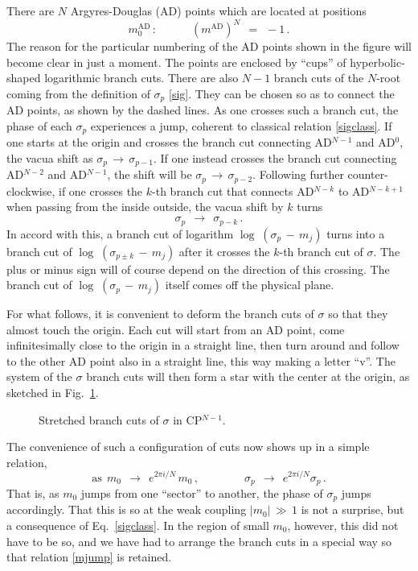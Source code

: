 \documentclass[epsfig,12pt]{article}
\def\beq{\begin{equation}}
\def\eeq{\end{equation}}
\def\beq{\begin{equation}}
\def\eeq{\end{equation}}
\begin{document}
	There are $ N $ Argyres-Douglas (AD) points \cite{AD} which are located at positions
\beq
	m_0^\text{AD} \,: \qquad\quad \left( m^\text{AD} \right)^N ~~=~~ -1 \,.
\eeq
	The reason for the particular numbering of the AD points shown in the figure will become clear in just a moment.
	The points are enclosed by ``cups'' of hyperbolic-shaped logarithmic branch cuts.
	There are also $ N - 1 $ branch cuts of the $ N $-root coming from the definition of $ \sigma_p $ \eqref{sig}.
	They can be chosen so as to connect the AD points, as shown by the dashed lines.
	As one crosses such a branch cut, the phase of each $ \sigma_p $ experiences a jump, 
	coherent to classical relation \eqref{sigclass}. 
	If one starts at the origin and crosses the branch cut connecting AD$^{N-1}$ and AD$^0$, 
	the vacua shift as $ \sigma_p \,\to\, \sigma_{p-1} $.
	If one instead crosses the branch cut connecting AD$^{N-2}$ and AD$^{N-1}$,
	the shift will be $ \sigma_p \,\to\, \sigma_{p-2} $.
	Following further counter-clockwise, if one crosses the $ k $-th branch cut 
	that connects AD$^{N-k}$ to AD$^{N-k+1}$ when passing from the inside outside, the vacua shift by $ k $ turns
\beq
\label{sigshift}
	\sigma_p ~~\to~~ \sigma_{p-k} \,.
\eeq
	In accord with this, a branch cut of logarithm $ \log\;( \sigma_p \,-\, m_j ) $ turns into 
	a branch cut of $ \log\;( \sigma_{p \pm k} \,-\, m_j ) $ after it crosses the $ k $-th branch cut of $ \sigma $. 
	The plus or minus sign will of course depend on the direction of this crossing. 
	The branch cut of $ \log\;( \sigma_p \,-\, m_j ) $ itself comes off the physical plane.

	For what follows, it is convenient to deform the branch cuts of $ \sigma $ so that they almost touch the origin.
	Each cut will start from an AD point, come infinitesimally close to the origin in a straight line, 
	then turn around and follow to the other AD point also in a straight line, this way making a letter ``v''.
	The system of the $ \sigma $ branch cuts will then form a star with the center at the origin, as sketched in Fig.~\ref{fsigcpn}.
\begin{figure}
\begin{center}
\epsfxsize=8.0cm
\caption{Stretched branch cuts of $ \sigma $ in CP$^{N-1}$.}
\label{fsigcpn}
\end{center}
\end{figure}
	The convenience of such a configuration of cuts now shows up in a simple relation,
\beq
\label{mjump}
	\text{as}~~ m_0 ~~\to~~ e^{2\pi i / N}\, m_0\,,  \qquad\qquad \sigma_p ~~\to~~ e^{2\pi i / N} \sigma_p\,.
\eeq
	That is, as $ m_0 $ jumps from one ``sector'' to another, the phase of $ \sigma_p $ jumps accordingly.
	That this is so at the weak coupling $ |m_0| \,\gg\, 1 $ is not a surprise, but a consequence of Eq.~\eqref{sigclass}.
	In the region of small $ m_0 $, however, this did not have to be so, and we have had to arrange the branch cuts 
	in a special way so that relation \eqref{mjump} is retained.
\end{document}

